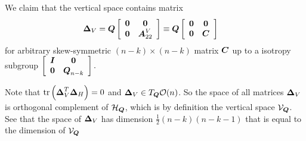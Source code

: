 \documentclass[11pt]{article}
\begin{document}
We claim that the vertical space contains matrix
\begin{align*}
\boldsymbol{\Delta}_{V}  &= \boldsymbol{Q}\left[\begin{array}{cc}
\boldsymbol{0} & \boldsymbol{0} \\ 
\boldsymbol{0} & \boldsymbol{A}^{V}_{22}
\end{array} \right] \equiv \boldsymbol{Q}\left[\begin{array}{cc}
\boldsymbol{0} & \boldsymbol{0} \\ 
\boldsymbol{0} & \boldsymbol{C}
\end{array} \right] 
\end{align*} for arbitrary skew-symmetric $(n-k)\times(n-k)$ matrix $\boldsymbol{C}$
up to a isotropy subgroup $\left[\begin{array}{cc}
\boldsymbol{I} & \boldsymbol{0} \\ 
\boldsymbol{0} & \boldsymbol{Q}_{n-k}
\end{array}\right].$

Note that $\mathrm{tr}\left(\boldsymbol{\Delta}_{V}^{T}\boldsymbol{\Delta}_{H} \right) = 0$ and  $\boldsymbol{\Delta}_{V} \in T_{\boldsymbol{Q}}{\mathcal O}(n)$. So the space of all matrices $\boldsymbol{\Delta}_{V}$ is orthogonal complement of $\mathcal{H}_{\boldsymbol{Q}}$, which is by definition the vertical space $\mathcal{V}_{\boldsymbol{Q}}$.  See that the space of $\boldsymbol{\Delta}_{V}$ has dimension $\frac{1}{2}(n-k)(n-k-1)$ that is equal to the dimension of $\mathcal{V}_{\boldsymbol{Q}}$
\end{document}
